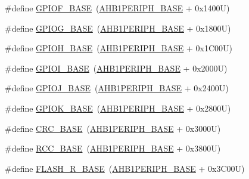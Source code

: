 \begin{DoxyCompactItemize}
\item 
\#define \hyperlink{group___peripheral__memory__map_ga7f9a3f4223a1a784af464a114978d26e}{G\+P\+I\+O\+F\+\_\+\+B\+A\+SE}~(\hyperlink{group___peripheral__memory__map_ga811a9a4ca17f0a50354a9169541d56c4}{A\+H\+B1\+P\+E\+R\+I\+P\+H\+\_\+\+B\+A\+SE} + 0x1400\+U)
\item 
\#define \hyperlink{group___peripheral__memory__map_ga5d8ca4020f2e8c00bde974e8e7c13cfe}{G\+P\+I\+O\+G\+\_\+\+B\+A\+SE}~(\hyperlink{group___peripheral__memory__map_ga811a9a4ca17f0a50354a9169541d56c4}{A\+H\+B1\+P\+E\+R\+I\+P\+H\+\_\+\+B\+A\+SE} + 0x1800\+U)
\item 
\#define \hyperlink{group___peripheral__memory__map_gaee4716389f3a1c727495375b76645608}{G\+P\+I\+O\+H\+\_\+\+B\+A\+SE}~(\hyperlink{group___peripheral__memory__map_ga811a9a4ca17f0a50354a9169541d56c4}{A\+H\+B1\+P\+E\+R\+I\+P\+H\+\_\+\+B\+A\+SE} + 0x1\+C00\+U)
\item 
\#define \hyperlink{group___peripheral__memory__map_ga50acf918c2e1c4597d5ccfe25eb3ad3d}{G\+P\+I\+O\+I\+\_\+\+B\+A\+SE}~(\hyperlink{group___peripheral__memory__map_ga811a9a4ca17f0a50354a9169541d56c4}{A\+H\+B1\+P\+E\+R\+I\+P\+H\+\_\+\+B\+A\+SE} + 0x2000\+U)
\item 
\#define \hyperlink{group___peripheral__memory__map_ga73f5a4e42f41acc614ee82c8ebfe0b85}{G\+P\+I\+O\+J\+\_\+\+B\+A\+SE}~(\hyperlink{group___peripheral__memory__map_ga811a9a4ca17f0a50354a9169541d56c4}{A\+H\+B1\+P\+E\+R\+I\+P\+H\+\_\+\+B\+A\+SE} + 0x2400\+U)
\item 
\#define \hyperlink{group___peripheral__memory__map_ga46d3f8cd7c045b5e13cd7395b8e936e5}{G\+P\+I\+O\+K\+\_\+\+B\+A\+SE}~(\hyperlink{group___peripheral__memory__map_ga811a9a4ca17f0a50354a9169541d56c4}{A\+H\+B1\+P\+E\+R\+I\+P\+H\+\_\+\+B\+A\+SE} + 0x2800\+U)
\item 
\#define \hyperlink{group___peripheral__memory__map_ga656a447589e785594cbf2f45c835ad7e}{C\+R\+C\+\_\+\+B\+A\+SE}~(\hyperlink{group___peripheral__memory__map_ga811a9a4ca17f0a50354a9169541d56c4}{A\+H\+B1\+P\+E\+R\+I\+P\+H\+\_\+\+B\+A\+SE} + 0x3000\+U)
\item 
\#define \hyperlink{group___peripheral__memory__map_ga0e681b03f364532055d88f63fec0d99d}{R\+C\+C\+\_\+\+B\+A\+SE}~(\hyperlink{group___peripheral__memory__map_ga811a9a4ca17f0a50354a9169541d56c4}{A\+H\+B1\+P\+E\+R\+I\+P\+H\+\_\+\+B\+A\+SE} + 0x3800\+U)
\item 
\#define \hyperlink{group___peripheral__memory__map_ga8e21f4845015730c5731763169ec0e9b}{F\+L\+A\+S\+H\+\_\+\+R\+\_\+\+B\+A\+SE}~(\hyperlink{group___peripheral__memory__map_ga811a9a4ca17f0a50354a9169541d56c4}{A\+H\+B1\+P\+E\+R\+I\+P\+H\+\_\+\+B\+A\+SE} + 0x3\+C00\+U)

\end{DoxyCompactItemize}
